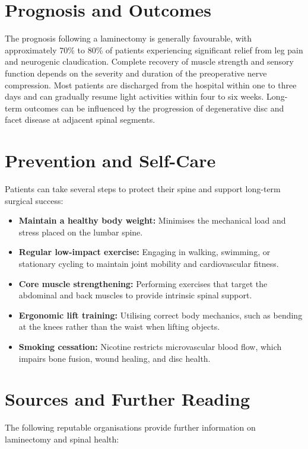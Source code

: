 \section*{Prognosis and Outcomes}
The prognosis following a laminectomy is generally favourable, with approximately 70\% to 80\% of patients experiencing significant relief from leg pain and neurogenic claudication. Complete recovery of muscle strength and sensory function depends on the severity and duration of the preoperative nerve compression. Most patients are discharged from the hospital within one to three days and can gradually resume light activities within four to six weeks. Long-term outcomes can be influenced by the progression of degenerative disc and facet disease at adjacent spinal segments.

\section*{Prevention and Self-Care}
Patients can take several steps to protect their spine and support long-term surgical success:

\begin{itemize}
    \item \textbf{Maintain a healthy body weight:} Minimises the mechanical load and stress placed on the lumbar spine.
    \item \textbf{Regular low-impact exercise:} Engaging in walking, swimming, or stationary cycling to maintain joint mobility and cardiovascular fitness.
    \item \textbf{Core muscle strengthening:} Performing exercises that target the abdominal and back muscles to provide intrinsic spinal support.
    \item \textbf{Ergonomic lift training:} Utilising correct body mechanics, such as bending at the knees rather than the waist when lifting objects.
    \item \textbf{Smoking cessation:} Nicotine restricts microvascular blood flow, which impairs bone fusion, wound healing, and disc health.
\end{itemize}

\section*{Sources and Further Reading}
The following reputable organisations provide further information on laminectomy and spinal health:


